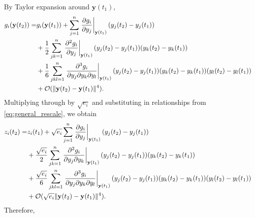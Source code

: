 By Taylor expansion around $\mathbf{y}(t_1)$,
%
\begin{equation}
\begin{aligned}
g_i(\mathbf{y}(t_2)) =&
g_i(\mathbf{y}(t_1)) + \sum_{j=1}^n \left. \frac{\partial g_i}{\partial y_j} \right|_{\mathbf{y}(t_1)} (y_j(t_2)-y_j(t_1))\\
&+ \frac{1}{2} \sum_{jk=1}^n \left. \frac{\partial^2 g_i}{\partial y_j} \right|_{\mathbf{y}(t_1)} (y_j(t_2)-y_j(t_1)) (y_k(t_2)-y_k(t_1))\\
&+ \frac{1}{6} \sum_{jkl=1}^n \left. \frac{\partial^3 g_i}{\partial y_j \partial y_k \partial y_l} \right|_{\mathbf{y}(t_1)} (y_j(t_2)-y_j(t_1)) (y_k(t_2)-y_k(t_1)) (y_l(t_2)-y_l(t_1)) \\
&+ \mathcal{O}( \|\mathbf{y}(t_2) - \mathbf{y}(t_1) \|^4) .
\end{aligned}
\end{equation}
%
Multiplying through by $\sqrt{e_i}$ and
substituting in relationships from \eqref{eq:general_rescale}, we obtain
%
\begin{equation}
\begin{aligned}
z_i(t_2) =&
z_i(t_1) + \sqrt{e_i} \sum_{j=1}^n \left. \frac{\partial g_i}{\partial y_j} \right|_{\mathbf{y}(t_1)} (y_j(t_2)-y_j(t_1))\\
&+ \frac{\sqrt{e_i}}{2} \sum_{jk=1}^n \left. \frac{\partial^2 g_i}{\partial y_j \partial y_k} \right|_{\mathbf{y}(t_1)} (y_j(t_2)-y_j(t_1)) (y_k(t_2)-y_k(t_1))\\
&+ \frac{\sqrt{e_i}}{6} \sum_{jkl=1}^n \left. \frac{\partial^3 g_i}{\partial y_j \partial y_k \partial y_l} \right|_{\mathbf{y}(t_1)} (y_j(t_2)-y_j(t_1)) (y_k(t_2)-y_k(t_1)) (y_l(t_2)-y_l(t_1)) \\
&+ \mathcal{O}( \sqrt{e_i} \|\mathbf{y}(t_2) - \mathbf{y}(t_1) \|^4) .
\end{aligned}
\end{equation}
%
Therefore,
%
